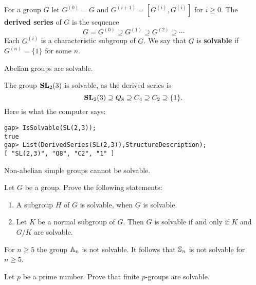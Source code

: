 \chapter{}


For a group $G$ let 
$G^{(0)}=G$ and 
$G^{(i+1)}=[G^{(i)},G^{(i)}]$ for $i\geq0$.
The \textbf{derived series} of $G$ is the sequence
\[
G=G^{(0)}\supseteq G^{(1)}\supseteq G^{(2)}\supseteq\cdots
\]
Each $G^{(i)}$ is a characteristic subgroup of $G$. We say that 
$G$ is \textbf{solvable} if $G^{(n)}=\{1\}$ for some $n$.  

\begin{example}
	Abelian groups are solvable. 
\end{example}

\begin{example}
	The group $\mathbf{SL}_2(3)$ is solvable, as the derived series is 
	\[
	\mathbf{SL}_2(3)\supseteq Q_8\supseteq C_4\supseteq C_2\supseteq \{1\}.
	\]
	Here is what the computer says:
\begin{lstlisting}
gap> IsSolvable(SL(2,3));
true
gap> List(DerivedSeries(SL(2,3)),StructureDescription);
[ "SL(2,3)", "Q8", "C2", "1" ]
\end{lstlisting}
\end{example}

\begin{example}
	Non-abelian simple groups cannot be solvable. 
\end{example}

\begin{exercise}
	\label{xca:solvable}
	Let $G$ be a group. Prove the following statements:
	\begin{enumerate}
		\item A subgroup $H$ of $G$ is solvable, when $G$ is solvable.
		\item Let $K$ be a normal subgroup of $G$. 
		    Then $G$ is solvable if and only if $K$ and $G/K$ are solvable.
	\end{enumerate}
\end{exercise}

\begin{example}
	For $n\geq5$ the group $\mathbb{A}_n$ is not solvable. It follows that 
	$\mathbb{S}_n$ is not solvable for $n\geq5$. 
\end{example}

\begin{exercise}
\label{xca:pgroups_solvable}
	Let $p$ be a prime number. Prove that 
	finite $p$-groups are solvable.
\end{exercise}


